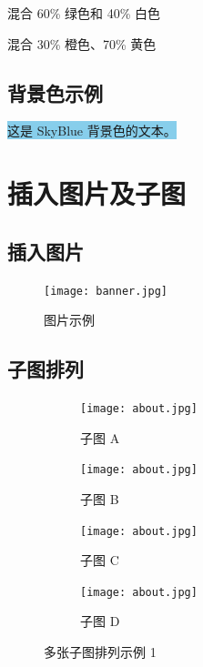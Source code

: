 \documentclass[fontset=none]{ctexart}
\begin{document}
\textcolor{green!60!white}{混合 60\% 绿色和 40\% 白色}

\textcolor{orange!30!yellow!70}{混合 30\% 橙色、70\% 黄色}

\subsection{背景色示例}


\colorbox{SkyBlue}{这是 SkyBlue 背景色的文本。}


\section{插入图片及子图}

\subsection{插入图片}

\begin{figure}[!htb]
    \centering
    \texttt{[image: banner.jpg]}\\
    \caption{图片示例}
\end{figure}

\subsection{子图排列}

\begin{figure}[!htbp]
    \begin{subfigure}[b]{0.48\textwidth}
        \texttt{[image: about.jpg]}
        \caption{子图 A}
        \label{fig:subfig_a}
    \end{subfigure}
    \hfill
    \begin{subfigure}[b]{0.48\textwidth}
        \texttt{[image: about.jpg]}
        \caption{子图 B}
        \label{fig:subfig_b}
    \end{subfigure}

    \begin{subfigure}[b]{0.48\textwidth}
        \texttt{[image: about.jpg]}
        \caption{子图 C}
        \label{fig:subfig_c}
    \end{subfigure}
    \hfill
    \begin{subfigure}[b]{0.48\textwidth}
        \texttt{[image: about.jpg]}
        \caption{子图 D}
        \label{fig:subfig_d}
    \end{subfigure}

    \centering
    \caption{多张子图排列示例 1}
    \label{fig:multi_subfigures}
\end{figure}
\end{document}
